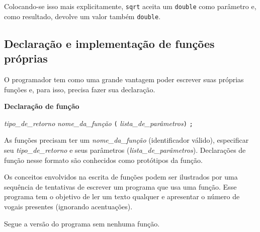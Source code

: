 \documentclass[
  11pt,
  a4paper,
]{scrbook}
\begin{document}
Colocando-se isso mais explicitamente, \texttt{sqrt} aceita um
\texttt{double} como parâmetro e, como resultado, devolve um valor
também \texttt{double}.

\subsection{Declaração e implementação de funções
próprias}\label{declarauxe7uxe3o-e-implementauxe7uxe3o-de-funuxe7uxf5es-pruxf3prias}

O programador tem como uma grande vantagem poder escrever suas próprias
funções e, para isso, precisa fazer sua declaração.

\begin{tcolorbox}[enhanced jigsaw, colback=white, arc=.35mm, colframe=quarto-callout-color-frame, toprule=.15mm, leftrule=.75mm, left=2mm, rightrule=.15mm, bottomrule=.15mm, opacityback=0, breakable]

\vspace{-3mm}\textbf{Declaração de função}\vspace{3mm}

\emph{tipo\_de\_retorno} \emph{nome\_da\_função} \texttt{(}
\emph{lista\_de\_parâmetros}\texttt{)} \texttt{;}

\end{tcolorbox}

As funções precisam ter um \emph{nome\_da\_função} (identificador
válido), especificar seu \emph{tipo\_de\_retorno} e seus parâmetros
(\emph{lista\_de\_parâmetros}). Declarações de função nesse formato são
conhecidos como protótipos da função.

Os conceitos envolvidos na escrita de funções podem ser ilustrados por
uma sequência de tentativas de escrever um programa que usa uma função.
Esse programa tem o objetivo de ler um texto qualquer e apresentar o
número de vogais presentes (ignorando acentuações).

Segue a versão do programa sem nenhuma função.
\end{document}
